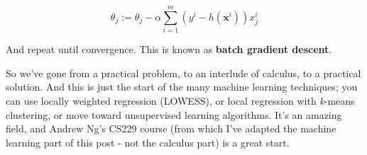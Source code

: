 \documentclass{article}
\begin{document}
\begin{equation}
\theta_{j} := \theta_{j} - \alpha \sum_{i=1}^{m} (y^{i} - h(\textbf{x}^{i})) x_{j}^{i}
\end{equation}

And repeat until convergence. This is known as \textbf{batch gradient descent}.

So we've gone from a practical problem, to an interlude of calculus, to a practical solution. And this is just the start of the many machine learning techniques; you can use locally weighted regression (LOWESS), or local regression with \textit{k}-means clustering, or move toward unsupervised learning algorithms. It's an amazing field, and Andrew Ng's CS229 course (from which I've adapted the machine learning part of this post - not the calculus part) is a great start.
\end{document}
